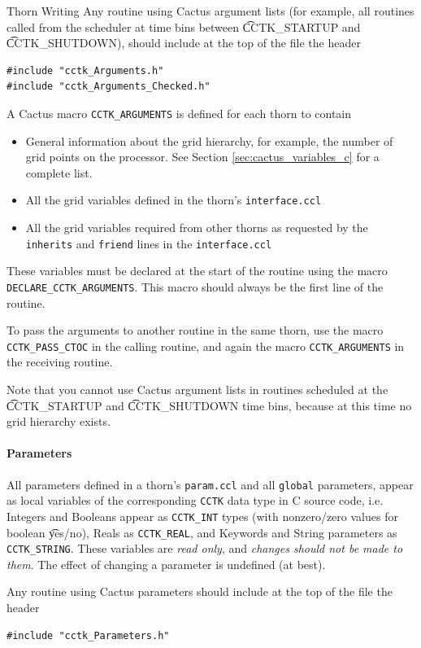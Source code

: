 \begin{cactuspart}{Thorn Writing}
Any routine using Cactus argument lists (for example, all routines called from
the scheduler at time bins between {\t CCTK\_STARTUP} and {\t CCTK\_SHUTDOWN}),
should include at the top of the file the header
\begin{verbatim}
#include "cctk_Arguments.h"
#include "cctk_Arguments_Checked.h"
\end{verbatim}

A Cactus macro \texttt{CCTK\_ARGUMENTS} is defined for each thorn
to contain
\begin{itemize}
\item General information about the grid hierarchy, for example, the
number of grid points on the processor. See Section \ref{sec:cactus_variables_c}
for a complete list.
\item All the grid variables defined in the thorn's \texttt{interface.ccl}
\item All the grid variables required from other thorns as requested by
      the \texttt{inherits} and \texttt{friend} lines in the \texttt{interface.ccl}
\end{itemize}
These variables must be declared at the start of the routine using
the macro \texttt{DECLARE\_CCTK\_ARGUMENTS}. This macro should always be the
first line of the routine.

To pass the arguments to another routine in the same thorn, use the macro
\texttt{CCTK\_PASS\_CTOC} in the calling routine, and again the macro
\texttt{CCTK\_ARGUMENTS} in the receiving routine.

Note that you cannot use Cactus argument lists in routines scheduled at the
{\t CCTK\_STARTUP} and {\t CCTK\_SHUTDOWN} time bins, because at this time
no grid hierarchy exists.


\paragraph{Parameters}

All parameters defined in a thorn's \texttt{param.ccl} and all \texttt{global}
parameters, appear as local variables of the corresponding \texttt{CCTK} data type
in C source code, i.e. Integers and Booleans appear as \texttt{CCTK\_INT} types
(with nonzero/zero values for boolean {\t yes/no}), Reals as
\texttt{CCTK\_REAL}, and Keywords and String parameters as \texttt{CCTK\_STRING}.
These variables are \emph{read only}, and \emph{changes should not be made to
them}.  The effect of changing a parameter is undefined (at best).

Any routine using Cactus parameters should include at
the top of the file the header
\begin{verbatim}
#include "cctk_Parameters.h"
\end{verbatim}


\end{cactuspart}
